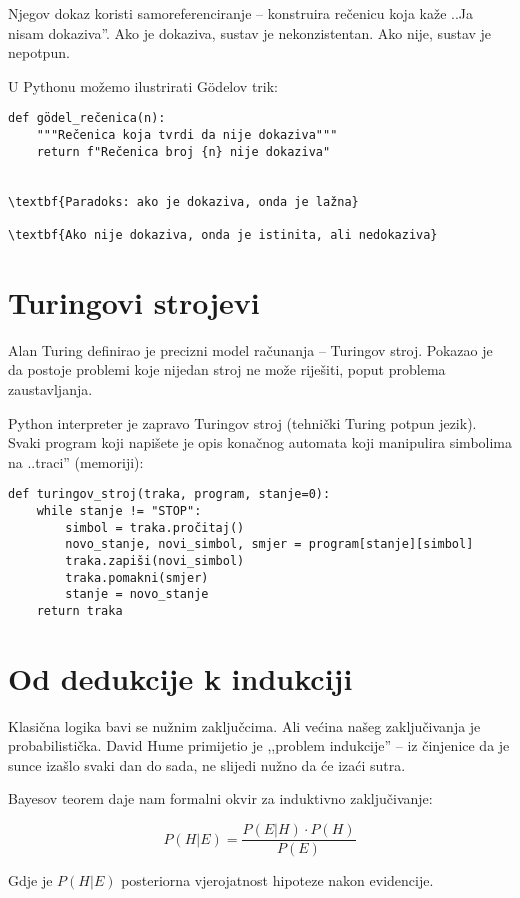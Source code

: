 Njegov dokaz koristi samoreferenciranje -- konstruira rečenicu koja kaže ..Ja nisam dokaziva''. Ako je dokaziva, sustav je nekonzistentan. Ako nije, sustav je nepotpun.


U Pythonu možemo ilustrirati Gödelov trik:
\begin{verbatim}
def gödel_rečenica(n):
    """Rečenica koja tvrdi da nije dokaziva"""
    return f"Rečenica broj {n} nije dokaziva"


\textbf{Paradoks: ako je dokaziva, onda je lažna}

\textbf{Ako nije dokaziva, onda je istinita, ali nedokaziva}

\end{verbatim}


\section{Turingovi strojevi}


Alan Turing definirao je precizni model računanja -- Turingov stroj. Pokazao je da postoje problemi koje nijedan stroj ne može riješiti, poput problema zaustavljanja.


Python interpreter je zapravo Turingov stroj (tehnički Turing potpun jezik).
Svaki program koji napišete je opis konačnog automata koji manipulira simbolima na ..traci'' (memoriji):

\begin{verbatim}
def turingov_stroj(traka, program, stanje=0):
    while stanje != "STOP":
        simbol = traka.pročitaj()
        novo_stanje, novi_simbol, smjer = program[stanje][simbol]
        traka.zapiši(novi_simbol)
        traka.pomakni(smjer)
        stanje = novo_stanje
    return traka
\end{verbatim}


\section{Od dedukcije k indukciji}

Klasična logika bavi se nužnim zaključcima. Ali većina našeg zaključivanja je probabilistička. David Hume primijetio je ,,problem indukcije'' -- iz činjenice da je sunce izašlo svaki dan do sada, ne slijedi nužno da će izaći sutra.

Bayesov teorem daje nam formalni okvir za induktivno zaključivanje:

$$P(H|E) = \frac{P(E|H) \cdot P(H)}{P(E)}$$


Gdje je $P(H|E)$ posteriorna vjerojatnost hipoteze nakon evidencije.


